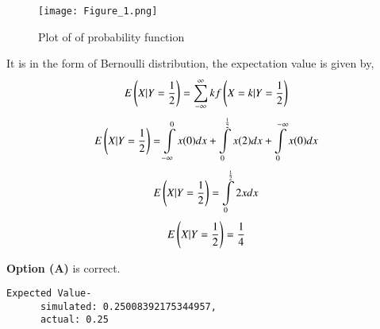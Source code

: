 \documentclass[journal,12pt,twocolumn]{IEEEtran}
\begin{document}
\begin{figure}[h!]
    \centering
    \texttt{[image: Figure\_1.png]}
    \caption{Plot of of probability function}
    \label{fig:plot}
\end{figure}

It is in the form of Bernoulli distribution, the expectation value is given by,
\begin{align}
    E\left(X|Y=\frac{1}{2}\right)=\sum\limits_{-\infty}^{\infty}k f\left(X=k|Y=\frac{1}{2}\right)
\end{align}
\begin{align}
    E\left(X|Y=\frac{1}{2}\right)=\int\limits_{-\infty}^0x(0)d x + \int\limits_0^\frac{1}{2}x(2)d x + \int\limits^{-\infty}_0x(0)d x
\end{align}
\begin{align}
    E\left(X|Y=\frac{1}{2}\right)=\int\limits_0^\frac{1}{2}2x d x
\end{align}
\begin{align}
    E\left(X|Y=\frac{1}{2}\right)=\frac{1}{4}
\end{align}

\textbf{Option (A)} is correct.
\begin{lstlisting}
Expected Value-
      simulated: 0.25008392175344957,
      actual: 0.25
\end{lstlisting}
\end{document}
